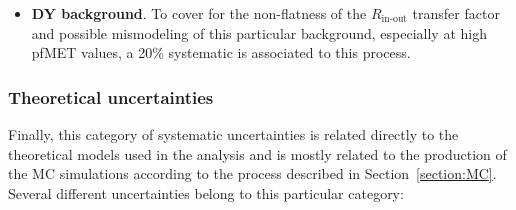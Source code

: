 \documentclass[a4paper, 10pt, openright]{report}
\begin{document}
\begin{itemize}
\item \textbf{\acf{DY} background}. To cover for the non-flatness of the $R_{\text{in-out}}$ transfer factor and possible mismodeling of this particular background, especially at high pf\ac{MET} values, a 20\% systematic is associated to this process.
\end{itemize}

\subsubsection{Theoretical uncertainties}

Finally, this category of systematic uncertainties is related directly to the theoretical models used in the analysis and is mostly related to the production of the \ac{MC} simulations according to the process described in Section~\ref{section:MC}. Several different uncertainties belong to this particular category:
\end{document}
